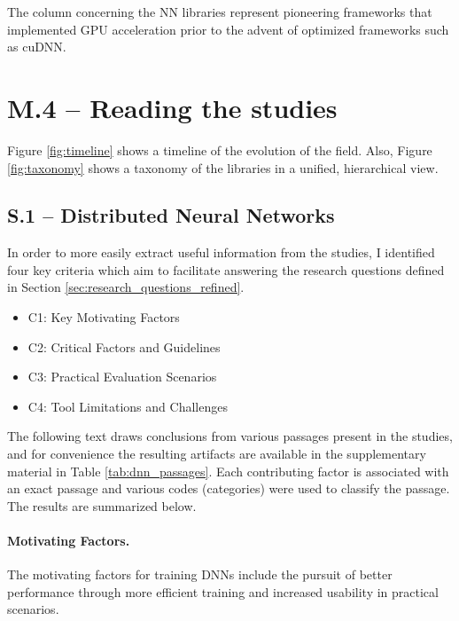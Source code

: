 The column concerning the NN libraries \cite{Jia.EtAl_2014a,krizhevsky_imagenet_2012,
	Goodfellow.EtAl_2013,Collobert.EtAl_} represent pioneering frameworks that implemented GPU
acceleration prior to the advent of optimized frameworks such as cuDNN.

\section{M.4 -- Reading the studies}
\label{sec:reading-studies}
Figure \ref{fig:timeline} shows a timeline of the evolution of the field. Also, Figure \ref{fig:taxonomy}
shows a taxonomy of the libraries in a unified, hierarchical view.

\subsection{S.1 -- Distributed Neural Networks}
\label{sec:dnn-studies}

In order to more easily extract useful information from the studies, I identified four key criteria
which aim to facilitate answering the research questions defined in Section
\ref{sec:research_questions_refined}.

\begin{itemize}
	\item C1: Key Motivating Factors
	\item C2: Critical Factors and Guidelines
	\item C3: Practical Evaluation Scenarios
	\item C4: Tool Limitations and Challenges
\end{itemize}

The following text draws conclusions from various passages present in the studies, and for
convenience the resulting artifacts are available in the supplementary material in Table
\ref{tab:dnn_passages}. Each contributing factor is associated with an exact passage and various
codes (categories) were used to classify the passage. The results are summarized below.

\paragraph{Motivating Factors.}
The motivating factors for training DNNs include the pursuit of better performance through more
efficient training and increased usability in practical scenarios.

